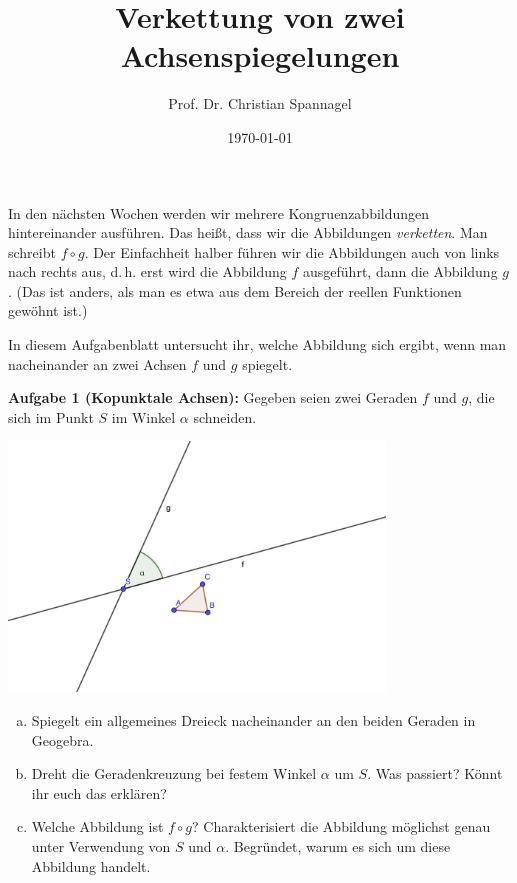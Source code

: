 \documentclass{cssheet}
\title{Verkettung von zwei Achsenspiegelungen}
\author{Prof. Dr. Christian Spannagel}
\date{\today}
\begin{document}
\printtitle

In den nächsten Wochen werden wir mehrere Kongruenzabbildungen hintereinander ausführen. Das heißt, dass wir die Abbildungen \emph{verketten}. Man schreibt $f\circ g$. Der Einfachheit halber führen wir die Abbildungen auch von links nach rechts aus, d.\,h. erst wird die Abbildung $f$ ausgeführt, dann die Abbildung $g$. (Das ist anders, als man es etwa aus dem Bereich der reellen Funktionen gewöhnt ist.)
 
In diesem Aufgabenblatt untersucht ihr, welche Abbildung sich ergibt, wenn man nacheinander an zwei Achsen $f$ und $g$ spiegelt. 

\textbf{Aufgabe 1 (Kopunktale Achsen):}  Gegeben seien zwei Geraden $f$ und $g$, die sich im Punkt $S$ im Winkel $\alpha$ schneiden.
\begin{center}
\includegraphics[width=10cm]{sich-schneidende-geraden.png}
\end{center}
\begin{enumerate}[a)]
\item Spiegelt ein allgemeines Dreieck nacheinander an den beiden Geraden in Geogebra. 
\item Dreht die Geradenkreuzung bei festem Winkel $\alpha$ um $S$. Was passiert? Könnt ihr euch das erklären?
\item Welche Abbildung ist $f\circ g$? Charakterisiert die Abbildung möglichst genau unter Verwendung von $S$ und $\alpha$. Begründet, warum es sich um diese Abbildung handelt.
\end{enumerate}
\end{document}
